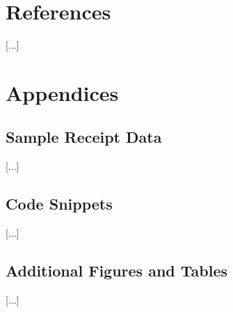 \documentclass{SGGW-thesis-EN}
\begin{document}
\chapter{References}
[...]

\chapter{Appendices}

\section{Sample Receipt Data}
[...]

\section{Code Snippets}
[...]

\section{Additional Figures and Tables}
[...]
\renewcommand{\bibname}{Bibliography}

\printbibliography

\beforelastpage
\end{document}
